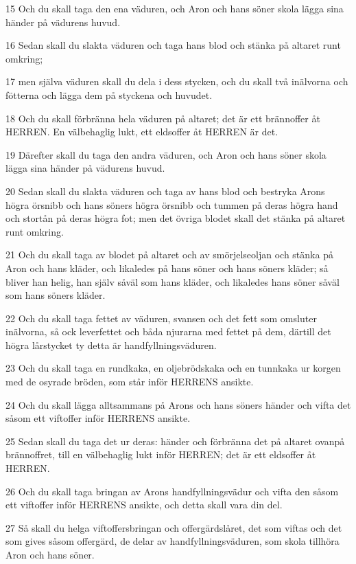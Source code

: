\par 15 Och du skall taga den ena väduren, och Aron och hans söner skola lägga sina händer på vädurens huvud.
\par 16 Sedan skall du slakta väduren och taga hans blod och stänka på altaret runt omkring;
\par 17 men själva väduren skall du dela i dess stycken, och du skall två inälvorna och fötterna och lägga dem på styckena och huvudet.
\par 18 Och du skall förbränna hela väduren på altaret; det är ett brännoffer åt HERREN. En välbehaglig lukt, ett eldsoffer åt HERREN är det.
\par 19 Därefter skall du taga den andra väduren, och Aron och hans söner skola lägga sina händer på vädurens huvud.
\par 20 Sedan skall du slakta väduren och taga av hans blod och bestryka Arons högra örsnibb och hans söners högra örsnibb och tummen på deras högra hand och stortån på deras högra fot; men det övriga blodet skall det stänka på altaret runt omkring.
\par 21 Och du skall taga av blodet på altaret och av smörjelseoljan och stänka på Aron och hans kläder, och likaledes på hans söner och hans söners kläder; så bliver han helig, han själv såväl som hans kläder, och likaledes hans söner såväl som hans söners kläder.
\par 22 Och du skall taga fettet av väduren, svansen och det fett som omsluter inälvorna, så ock leverfettet och båda njurarna med fettet på dem, därtill det högra lårstycket ty detta är handfyllningsväduren.
\par 23 Och du skall taga en rundkaka, en oljebrödskaka och en tunnkaka ur korgen med de osyrade bröden, som står inför HERRENS ansikte.
\par 24 Och du skall lägga alltsammans på Arons och hans söners händer och vifta det såsom ett viftoffer inför HERRENS ansikte.
\par 25 Sedan skall du taga det ur deras: händer och förbränna det på altaret ovanpå brännoffret, till en välbehaglig lukt inför HERREN; det är ett eldsoffer åt HERREN.
\par 26 Och du skall taga bringan av Arons handfyllningsvädur och vifta den såsom ett viftoffer inför HERRENS ansikte, och detta skall vara din del.
\par 27 Så skall du helga viftoffersbringan och offergärdslåret, det som viftas och det som gives såsom offergärd, de delar av handfyllningsväduren, som skola tillhöra Aron och hans söner.
